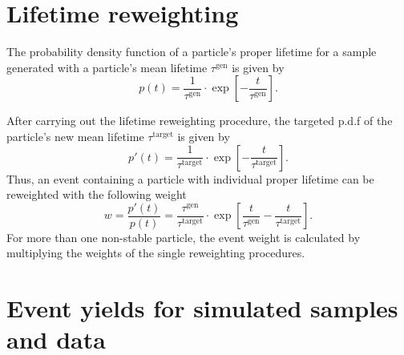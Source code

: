 \clearpage
\FloatBarrier
\section{Lifetime reweighting}
\label{app:LifetimeReweighting}
The probability density function of a particle's proper lifetime for a sample generated with a particle's mean lifetime $\tau^{\text{gen}}$ is given by
\begin{equation*}
p \left( t \right) = \frac{1}{\tau^{\text{gen}}} \cdot \exp\left[ -\frac{t}{\tau^{\text{gen}}} \right].
\end{equation*}

After carrying out the lifetime reweighting procedure, the targeted p.d.f of the particle's new mean lifetime $\tau^{\text{target}}$ is given by
\begin{equation*}
p'  \left( t \right) = \frac{1}{\tau^{\text{target}}} \cdot \exp\left[ -\frac{t}{\tau^{\text{target}}} \right].
\end{equation*}
Thus, an event containing a particle with individual proper lifetime can be reweighted with the following weight
\begin{equation*}
\label{eq:reweight}
w = \frac{p'  \left( t \right)}{p \left( t \right)} = \frac{\tau^{\text{gen}}}{\tau^{\text{target}}} \cdot \exp\left[ \frac{t}{\tau^{\text{gen}}} - \frac{t}{\tau^{\text{target}}} \right].  %
\end{equation*}
For more than one non-stable particle, the event weight is calculated by multiplying the weights of the single reweighting procedures.

\clearpage
\FloatBarrier
\section{Event yields for simulated samples and data}
\label{app:cutflow}



